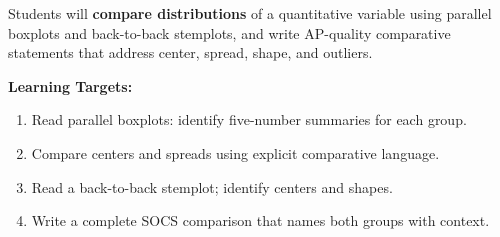 \documentclass[aspectratio=169, 11pt]{beamer}
\begin{document}
{
\begin{frame}[t, plain]
  \vspace{0.45cm}\par
  \hspace{0.55cm}%
  \begin{minipage}{0.9\textwidth}


    \normalsize
    Students will \textbf{compare distributions} of a quantitative variable
    using parallel boxplots and back-to-back stemplots, and write AP-quality
    comparative statements that address center, spread, shape, and outliers.

    \vspace{0.5cm}
    \textbf{Learning Targets:}
    \begin{enumerate}\small
      \setlength{\itemsep}{0.4em}
      \item Read parallel boxplots: identify five-number summaries for each group.
      \item Compare centers and spreads using explicit comparative language.
      \item Read a back-to-back stemplot; identify centers and shapes.
      \item Write a complete SOCS comparison that names both groups with context.
    \end{enumerate}
  \end{minipage}
\end{frame}
}
\end{document}
